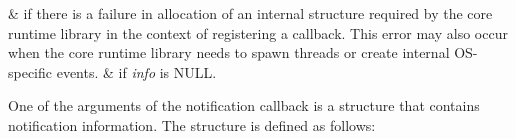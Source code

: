 \begin{easylist}
&  if there is a failure
in allocation of an internal structure required by the core runtime
library in the context of registering a callback. This error may
also occur when the core runtime library needs to spawn threads or
create internal OS-specific events. 
&  
if {\itshape info} is NULL.
\end{easylist}

One of the arguments of the notification callback is a structure
that contains notification information. The structure is defined as
follows:


